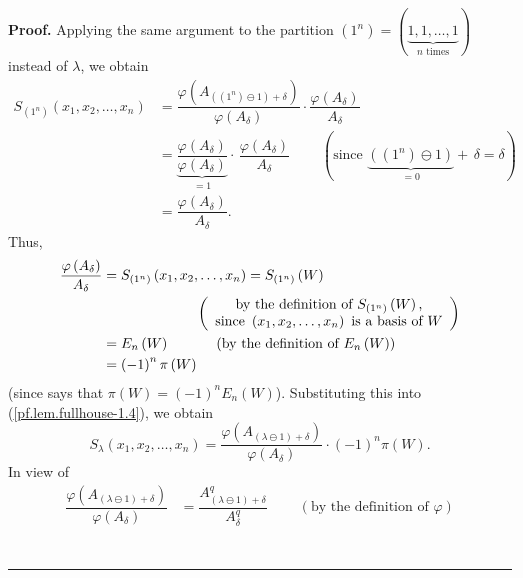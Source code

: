 \documentclass[numbers=enddot,12pt,final,onecolumn,notitlepage]{scrartcl}%
\numberwithin{exer}{section}
\theoremstyle{definition}
\newenvironment{proof}[1][Proof]{\noindent\textbf{#1.} }{\ \rule{0.5em}{0.5em}}
\theoremstyle{plainsl}
\begin{document}
\begin{proof}
Applying the same argument to the partition $\left(  1^{n}\right)  =\left(
\underbrace{1,1,\ldots,1}_{n\text{ times}}\right)  $ instead of $\lambda$, we
obtain%
\begin{align*}
S_{\left(  1^{n}\right)  }\left(  x_{1},x_{2},\ldots,x_{n}\right)   &
=\dfrac{\varphi\left(  A_{\left(  \left(  1^{n}\right)  \ominus1\right)
+\delta}\right)  }{\varphi\left(  A_{\delta}\right)  }\cdot\dfrac
{\varphi\left(  A_{\delta}\right)  }{A_{\delta}}\\
&  =\underbrace{\dfrac{\varphi\left(  A_{\delta}\right)  }{\varphi\left(
A_{\delta}\right)  }}_{=1}\cdot\,\dfrac{\varphi\left(  A_{\delta}\right)
}{A_{\delta}}\ \ \ \ \ \ \ \ \ \ \left(  \text{since }\underbrace{\left(
\left(  1^{n}\right)  \ominus1\right)  }_{=0}+\,\delta=\delta\right) \\
&  =\dfrac{\varphi\left(  A_{\delta}\right)  }{A_{\delta}}.
\end{align*}
Thus,%
\begin{align*}
\dfrac{\varphi\left(  A_{\delta}\right)  }{A_{\delta}}  &  =S_{\left(
1^{n}\right)  }\left(  x_{1},x_{2},\ldots,x_{n}\right)  =S_{\left(
1^{n}\right)  }\left(  W\right) \\
&  \ \ \ \ \ \ \ \ \ \ \ \ \ \ \ \ \ \ \ \ \left(
\begin{array}
[c]{c}%
\text{by the definition of }S_{\left(  1^{n}\right)  }\left(  W\right)
\text{,}\\
\text{since }\left(  x_{1},x_{2},\ldots,x_{n}\right)  \text{ is a basis of }W
\end{array}
\right) \\
&  =E_{n}\left(  W\right)  \ \ \ \ \ \ \ \ \ \ \left(  \text{by the definition
of }E_{n}\left(  W\right)  \right) \\
&  =\left(  -1\right)  ^{n}\pi\left(  W\right)
\end{align*}
(since \cite[(7.20)]{Macdon92} says that $\pi\left(  W\right)  =\left(
-1\right)  ^{n}E_{n}\left(  W\right)  $). Substituting this into
(\ref{pf.lem.fullhouse-1.4}), we obtain%
\[
S_{\lambda}\left(  x_{1},x_{2},\ldots,x_{n}\right)  =\dfrac{\varphi\left(
A_{\left(  \lambda\ominus1\right)  +\delta}\right)  }{\varphi\left(
A_{\delta}\right)  }\cdot\left(  -1\right)  ^{n}\pi\left(  W\right)  .
\]
In view of%
\begin{align*}
\dfrac{\varphi\left(  A_{\left(  \lambda\ominus1\right)  +\delta}\right)
}{\varphi\left(  A_{\delta}\right)  }  &  =\dfrac{A_{\left(  \lambda
\ominus1\right)  +\delta}^{q}}{A_{\delta}^{q}}\ \ \ \ \ \ \ \ \ \ \left(
\text{by the definition of }\varphi\right) \\

\end{align*}
\end{proof}
\end{document}
